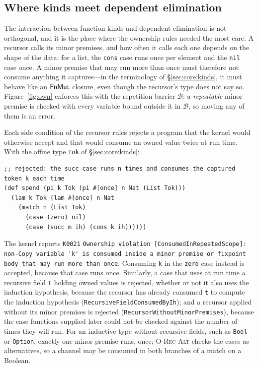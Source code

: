 \subsection{Where kinds meet dependent elimination}\label{sec:own:rec}

The interaction between function kinds and dependent elimination is not orthogonal, and it is the place where the ownership rules needed the most care.
A recursor calls its minor premises, and how often it calls each one depends on the shape of the data: for a list, the \lstinline|cons| case runs once per element and the \lstinline|nil| case once.
A minor premise that may run more than once must therefore not consume anything it captures---in the terminology of \S\ref{sec:core:kinds}, it must behave like an $\mathsf{FnMut}$ closure, even though the recursor's type does not say so.
Figure~\ref{fig:own} enforces this with the repetition barrier $\mathcal{B}$: a \emph{repeatable} minor premise is checked with every variable bound outside it in $\mathcal{B}$, so moving any of them is an error.

Each side condition of the recursor rules rejects a program that the kernel would otherwise accept and that would consume an owned value twice at run time.
With the affine type \lstinline|Tok| of \S\ref{sec:core:kinds}:
\begin{lstlisting}
;; rejected: the succ case runs n times and consumes the captured token k each time
(def spend (pi k Tok (pi #[once] n Nat (List Tok)))
  (lam k Tok (lam #[once] n Nat
    (match n (List Tok)
      (case (zero) nil)
      (case (succ m ih) (cons k ih))))))
\end{lstlisting}
The kernel reports \texttt{K0021} \lstinline|Ownership violation [ConsumedInRepeatedScope]: non-Copy variable 'k' is consumed inside a minor premise or fixpoint body that may run more than once|.
Consuming \lstinline|k| in the \lstinline|zero| case instead is accepted, because that case runs once.
Similarly, a case that uses at run time a recursive field \lstinline|t| holding owned values is rejected, whether or not it also uses the induction hypothesis, because the recursor has already consumed \lstinline|t| to compute the induction hypothesis (\lstinline|RecursiveFieldConsumedByIh|); and a recursor applied without its minor premises is rejected (\lstinline|RecursorWithoutMinorPremises|), because the case functions supplied later could not be checked against the number of times they will run.
For an inductive type without recursive fields, such as \lstinline|Bool| or \lstinline|Option|, exactly one minor premise runs, once; \textsc{O-Rec-Alt} checks the cases as alternatives, so a channel may be consumed in both branches of a match on a Boolean.

